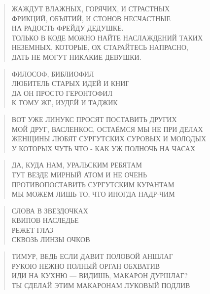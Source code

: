 \poemtitle{***}
\begin{verse}
ЖАЖДУТ ВЛАЖНЫХ, ГОРЯЧИХ, И СТРАСТНЫХ\\
ФРИКЦИЙ, ОБЪЯТИЙ, И СТОНОВ НЕСЧАСТНЫЕ\\
       НА РАДОСТЬ ФРЕЙДУ ДЕДУШКЕ.\\
ТОЛЬКО В КОДЕ МОЖНО НАЙТЕ НАСЛАЖДЕНИЙ ТАКИХ\\
НЕЗЕМНЫХ, КОТОРЫЕ, ОХ СТАРАЙТЕСЬ НАПРАСНО,\\
       ДАТЬ НЕ МОГУТ НИКАКИЕ ДЕВУШКИ.
\end{verse}

\poemtitle{***}
\begin{verse}
ФИЛОСОФ, БИБЛИОФИЛ\\
ЛЮБИТЕЛЬ СТАРЫХ ИДЕЙ И КНИГ\\
ДА ОН ПРОСТО ГЕРОНТОФИЛ\\
К ТОМУ ЖЕ, ИУДЕЙ И ТАДЖИК
\end{verse}

\poemtitle{***}
\begin{verse}
ВОТ УЖЕ ЛИНУКС ПРОСЯТ ПОСТАВИТЬ ДРУГИХ\\
МОЙ ДРУГ, ВАСЛЕНКОС, ОСТАЁМСЯ МЫ НЕ ПРИ ДЕЛАХ\\
ЖЕНЩИНЫ ЛЮБЯТ СУРГУТСКИХ СУРОВЫХ И МОЛОДЫХ\\
У КОТОРЫХ ЧУТЬ ЧТО - КАК УЖ ПОЛНОЧЬ НА ЧАСАХ
\end{verse}

\poemtitle{***}
\begin{verse}
ДА, КУДА НАМ, УРАЛЬСКИМ РЕБЯТАМ\\
ТУТ ВЕЗДЕ МИРНЫЙ АТОМ И НЕ ОЧЕНЬ\\
ПРОТИВОПОСТАВИТЬ СУРГУТСКИМ КУРАНТАМ\\
МЫ МОЖЕМ ЛИШЬ ТО, ЧТО ИНОГДА НАДР-ЧИМ
\end{verse}

\poemtitle{***}
\begin{verse}
СЛОВА В ЗВЕЗДОЧКАХ\\
КВИПОВ НАСЛЕДЬЕ\\
РЕЖЕТ ГЛАЗ\\
 СКВОЗЬ ЛИНЗЫ ОЧКОВ
\end{verse}

\poemtitle{***}
\begin{verse}
ТИМУР, ВЕДЬ ЕСЛИ ДАВИТ ПОЛОВОЙ АНШЛАГ\\
РУКОЮ НЕЖНО ПОЛНЫЙ ОРГАН ОБХВАТИВ\\
ИДИ НА КУХНЮ — ВИДИШЬ, МАКАРОН ДУРШЛАГ?\\
ТЫ СДЕЛАЙ ЭТИМ МАКАРОНАМ ЛУКОВЫЙ ПОДЛИВ
\end{verse}

